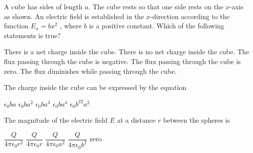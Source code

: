 \documentclass{../../oss-apphys-exam}
\begin{document}
\begin{questions}
  \question A cube has sides of length $a$. The cube rests so that one side
  rests on the $x$-axis as shown. An electric field is established in the
  $x$-direction according to the function $E_x=bx^2$ , where $b$ is a positive
  constant. Which of the following statements is true?
  \label{cube1}
  \begin{choices}
    \choice There is a net charge inside the cube.
    \choice There is no net charge inside the cube.
    \choice The flux passing through the cube is negative.
    \choice The flux passing through the cube is zero.
    \choice The flux diminishes while passing through the cube.
  \end{choices}
   
  \question The charge inside the cube can be expressed by the equation
  \label{cube2}
  \begin{choices}
    \choice $\epsilon_0ba$
    \choice $\epsilon_0ba^2$
    \choice $\epsilon_0ba^3$
    \choice $\epsilon_0ba^4$
    \choice $\epsilon_0b^22a^2$
  \end{choices}

  \question The magnitude of the electric field $E$ at a distance $r$ between
  the spheres is
  \label{cap1}
  \begin{choices}
    \choice $\dfrac Q{4\pi\epsilon_0r^2}$
    \choice $\dfrac Q{4\pi\epsilon_0r}$
    \choice $\dfrac Q{4\pi\epsilon_0a^2}$
    \choice $\dfrac Q{4\pi\epsilon_0b^2}$
    \choice zero
  \end{choices}


\end{questions}
\end{document}
